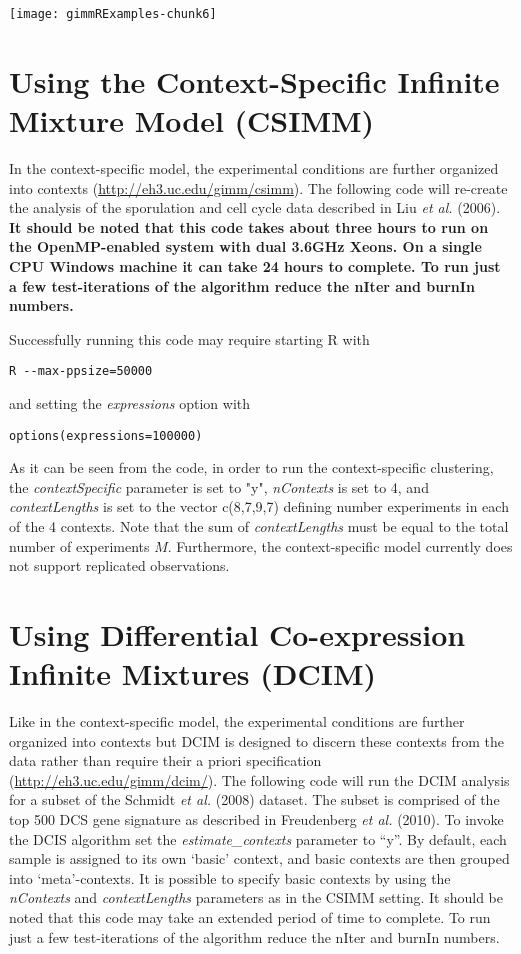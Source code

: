 \documentclass[12pt]{article}
\begin{document}
\texttt{[image: gimmRExamples-chunk6]}

\section{Using the Context-Specific Infinite Mixture Model (CSIMM)}

In the context-specific model, the experimental conditions are further organized into contexts (\underline {http://eh3.uc.edu/gimm/csimm}). The following code will re-create the analysis of the sporulation and cell cycle data described in Liu \textit{et al.} (2006). \textbf{It should be noted that this code takes about three hours to run on the OpenMP-enabled system with dual 3.6GHz Xeons. On a single CPU Windows machine it can take 24 hours to complete. To run just a few test-iterations of the algorithm reduce the nIter and burnIn numbers.} \newline

Successfully running this code may require starting R with

\begin{verbatim}
R --max-ppsize=50000
\end{verbatim}

and setting the \textit{expressions} option with

\begin{verbatim}
options(expressions=100000)
\end{verbatim}

As it can be seen from the code, in order to run the context-specific clustering, the \textit{contextSpecific} parameter is set to "y", \textit{nContexts} is set to 4, and \textit{contextLengths} is set to the vector c(8,7,9,7) defining number experiments in each of the 4 contexts. Note that the sum of \textit{contextLengths} must be equal to the total number of experiments $M$. Furthermore, the context-specific model currently does not support replicated observations.\newline


\section{Using Differential Co-expression Infinite Mixtures (DCIM)}
Like in the context-specific model, the experimental conditions are further organized into
contexts but DCIM is designed to discern these contexts from the data rather than require their a
priori specification (\underline{http://eh3.uc.edu/gimm/dcim/}). The following code will run the DCIM
analysis for a subset of the Schmidt \textit{et al.} (2008) dataset. The subset is comprised of the top 500
DCS gene signature as described in Freudenberg \textit{et al.} (2010). To invoke the DCIS algorithm set the \textit{estimate\_contexts}
parameter to ``y''. By default, each sample is assigned to its own `basic' context, and basic
contexts are then grouped into `meta'-contexts. It is possible to specify basic contexts by using
the \textit{nContexts} and \textit{contextLengths} parameters as in the CSIMM setting. It should be
noted that this code may take an extended period of time to complete. To run just a few
test-iterations of the algorithm reduce the nIter and burnIn numbers.\newline
\end{document}
